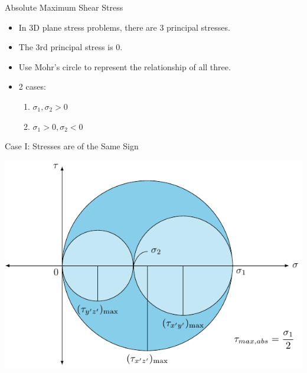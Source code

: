 \documentclass[10pt, svgnames]{beamer}
\begin{document}
\begin{frame}[label={sec:org6c53759}]{Absolute Maximum Shear Stress}
\begin{itemize}
\item In 3D plane stress problems, there are 3 principal stresses.

\item The 3rd principal stress is 0.

\item Use Mohr's circle to represent the relationship of all three.

\item 2 cases:

\begin{enumerate}
\item \(\sigma_1, \sigma_2 > 0\)

\item \(\sigma_1 > 0, \sigma_2 < 0\)
\end{enumerate}
\end{itemize}
\end{frame}

\begin{frame}[label={sec:org7f985e0}]{Case I: Stresses are of the Same Sign}
\begin{center}
\includegraphics[width=.9\linewidth]{pictures/abs-max-shear-case-I.pdf}
\end{center}
\end{frame}
\end{document}
